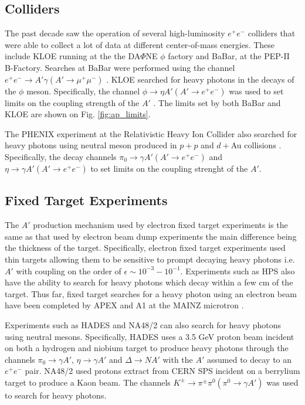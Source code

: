 \subsection{Colliders}

The past decade saw the operation of several high-luminosity $e^+e^-$ colliders 
that were able to collect a lot of data at different center-of-mass energies.
These include KLOE running at the the DA$\Phi$NE $\phi$ factory and BaBar, 
at the PEP-II B-Factory. Searches at BaBar were performed using the channel 
$e^+e^- \rightarrow A' \gamma (A' \rightarrow \mu^+\mu^-)$ 
\cite{Reece:2009un, Aubert:2009cp}.  KLOE 
searched for heavy photons in the decays of the $\phi$ meson.  Specifically, 
the channel $\phi \rightarrow \eta A' (A' \rightarrow e^+e^-)$ was used to
set limits on the coupling strength of the $A'$ 
\cite{Babusci:2012cr, Archilli:2011zc}.
The limits set by both BaBar and KLOE are shown on Fig. \ref{fig:ap_limits}.

The PHENIX experiment at the Relativistic Heavy Ion Collider also searched for
heavy photons using neutral meson produced in $p+p$  and $d+$Au collisions 
\cite{Adare:2014mgk}.
Specifically, the decay channels $\pi_0 \rightarrow \gamma A' (A' \rightarrow e^+e^-)$
and $\eta \rightarrow \gamma A' (A' \rightarrow e^+e^-)$ to set limits on the 
coupling strenght of the $A'$.

\subsection{Fixed Target Experiments}

The $A'$ production mechanism used by electron fixed target experiments is 
the same as that used by electron beam dump experiments the main difference
being the thickness of the target.  Specifically, electron fixed target 
experiments used thin targets allowing them to be sensitive to prompt 
decaying heavy photons i.e. $A'$ with coupling on the order of 
$\epsilon \sim 10^{-3} - 10^{-1}$.  Experiments such as HPS also have the 
ability to search  for heavy photons which decay within a few cm of the target.
Thus far, fixed target searches for a heavy photon using an electron beam
have been completed by APEX \cite{Abrahamyan:2011gv} and A1 at the 
MAINZ microtron \cite{Merkel:2014avp}.

Experiments such as HADES \cite{Agakishiev:2013fwl} and NA48/2 \cite{Batley:2015lha}
can also search for heavy photons using 
neutral mesons.  Specifically, HADES uses a 3.5 GeV proton beam incident on 
both a hydrogen and niobium target to produce heavy photons through the 
channels $\pi_0 \rightarrow \gamma A'$, $\eta \rightarrow \gamma A'$ and 
$\Delta \rightarrow N A'$ with the $A'$ assumed to decay to an $e^+e^-$ pair.
NA48/2 used protons extract from CERN SPS incident on a berrylium target to 
produce a Kaon beam.  The channels $K^{\pm} \rightarrow \pi^{\pm}\pi^0 (\pi^0 \rightarrow \gamma A')$
was used to search for heavy photons.  
